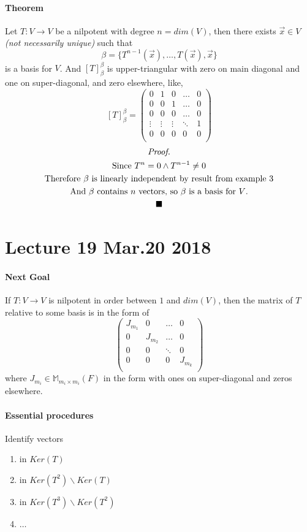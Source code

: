 \documentclass[11pt]{article}
\newcommand{\trans}[3]{{#1}: {#2} \to {#3}}
\newcommand{\tmat}[3]{[{#1}]_{{#2}}^{{#3}}}
\newcommand{\theorem}[0]{\paragraph{Theorem}}
\newcommand{\tx}[1]{\text{{#1}}}
\begin{document}
	\theorem Let $\trans{T}{V}{V}$ be a nilpotent with degree $n = dim(V)$, then there exists $\vec{x} \in V$\emph{(not necessarily unique)} such that 
	\[
		\beta = \{T^{n-1}(\vec{x}),\dots,T(\vec{x}),\vec{x}\}
	\]
	is a basis for $V$. And $\tmat{T}{\beta}{\beta}$ is upper-triangular with zero on main diagonal and one on super-diagonal, and zero elsewhere, like,
	\[
		\tmat{T}{\beta}{\beta} = 
		\begin{pmatrix}
			0 & 1 & 0 & \dots & 0 \\
			0 & 0 & 1 & \dots & 0 \\
			0 & 0 & 0 & \dots & 0 \\
			\vdots & \vdots & \vdots & \ddots & 1 \\
			0 & 0 & 0 & 0 & 0 \\
		\end{pmatrix}
	\]
	\begin{multline*}
		\emph{Proof.} \\
		\tx{Since } T^n = 0 \land T^{n-1} \neq 0 \\
		\tx{Therefore } \beta \tx{ is linearly independent by result from example 3} \\
		\tx{And $\beta$ contains $n$ vectors, so $\beta$ is a basis for $V$.} \\
		\blacksquare
	\end{multline*}

	\section{Lecture 19 Mar.20 2018}
	\paragraph{Next Goal} If $\trans{T}{V}{V}$ is nilpotent in order between $1$ and $dim(V)$, then the matrix of $T$ relative to some basis is in the form of
	\[
		\begin{pmatrix}
			J_{m_1} & 0 & \dots & 0 \\
			0 & J_{m_2} & \dots & 0 \\
			0 & 0 & \ddots & 0 \\
			0 & 0 & 0 & J_{m_k} \\
		\end{pmatrix}
	\]
	where $J_{m_i} \in \mathbb{M}_{m_i \times m_i}(F)$  in the form with ones on super-diagonal and zeros elsewhere.
	\paragraph{Essential procedures} Identify vectors
	\begin{enumerate}
		\item in $Ker(T)$
		\item in $Ker(T^2) \backslash Ker(T)$
		\item in $Ker(T^3) \backslash Ker(T^2)$
		\item $\dots$
	\end{enumerate}
	
\end{document}
